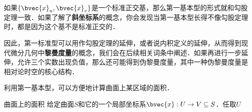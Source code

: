 如果$\{\bvec{x}_u, \bvec{x}_v\}$是一个标准正交基，那么第一基本型的形式就和勾股定理一致．如果了解了\textbf{斜坐标系}的概念，你会发现当第一基本型长得不像勾股定理时，都是因为这个基不是标准正交的．

因此，第一标准型可以用作勾股定理的延伸，或者说内积定义的延伸，从而得到现代微分几何中\textbf{黎曼度量}的概念，我们会在后续相关词条中阐述．如果再进行一步延伸，允许三个实数出现负值，那么还可能得到伪黎曼度量，其中一种伪黎曼度量是相对论时空的核心结构．

利用第一基本型，可以方便地计算曲面上某区域的面积．

\begin{theorem}{曲面上的面积}
给定曲面$S$和它的一个局部坐标系$\bvec{x}:U\to V\subseteq S$．任取$U$
\end{theorem}



